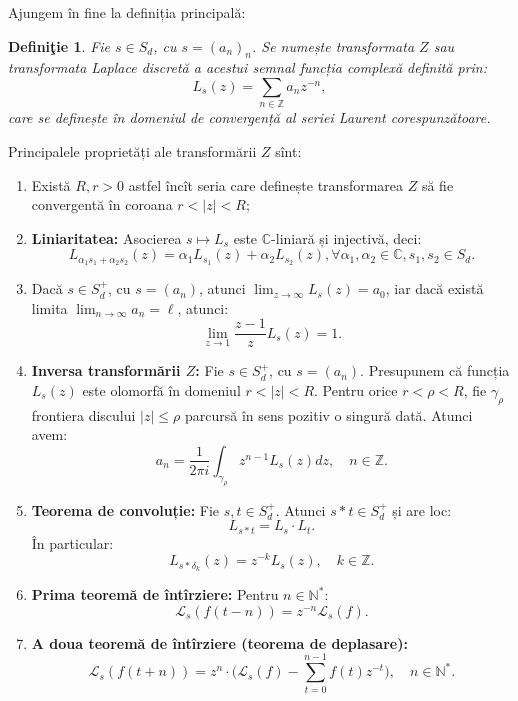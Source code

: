 \documentclass[12pt,a4paper]{article}
\newcommand\ds{\displaystyle}
\newcommand\NN{\mathbb{N}}
\newcommand\ZZ{\mathbb{Z}}
\newcommand\CC{\mathbb{C}}
\newcommand\Lap{\mathcal{L}}
\theoremstyle{dotless}
\theoremstyle{dotlessdr}
\newtheorem{definition}{Defini\c{t}ie}
\begin{document}
Ajungem în fine la definiția principală:
\begin{definition}\label{def:transf-z}
  Fie $ s \in S_d $, cu $ s = (a_n)_n $. Se numește \emph{transformata $ Z $} sau
  \emph{transformata Laplace discretă} a acestui semnal funcția complexă definită
  prin:
  \[
    L_s(z) = \sum_{n \in \ZZ} a_n z^{-n},
  \]
  care se definește în domeniul de convergență al seriei Laurent corespunzătoare.
\end{definition}

Principalele proprietăți ale transformării $ Z $ sînt:

\begin{enumerate}[(1)]
\item Există $ R, r > 0 $ astfel încît seria care definește transformarea $ Z $ să fie
  convergentă în coroana $ r < |z| < R $;
\item \textbf{Liniaritatea:} Asocierea $ s \mapsto L_s $ este $ \CC $-liniară și injectivă,
  deci:
  \[
    L_{\alpha_1 s_1 + \alpha_2 s_2}(z) = \alpha_1 L_{s_1}(z) + \alpha_2 L_{s_2}(z), %
    \forall \alpha_1, \alpha_2 \in \CC, s_1, s_2 \in S_d.
  \]
\item Dacă $ s \in S_d^+ $, cu $ s = (a_n) $, atunci $ \ds\lim_{z \to \infty} L_s(z) = a_0 $,
  iar dacă există limita $ \ds\lim_{n \to \infty} a_n = \ell $, atunci:
  \[
    \lim_{z \to 1} \frac{z - 1}{z} L_s(z) = 1.
  \]
\item \textbf{Inversa transformării $ Z $:} Fie $ s \in S_d^+ $, cu $ s = (a_n) $. Presupunem
  că funcția $ L_s(z) $ este olomorfă în domeniul $ r < |z| < R $. Pentru orice $ r < \rho < R $,
  fie $ \gamma_\rho $ frontiera discului $ |z| \leq \rho $ parcursă în sens pozitiv o singură
  dată. Atunci avem:
  \[
    a_n = \frac{1}{2 \pi i} \int_{\gamma_\rho} z^{n-1} L_s(z) dz, \quad n \in \ZZ.
  \]
\item \textbf{Teorema de convoluție:} Fie $ s, t \in S_d^+ $. Atunci $ s \ast t \in S_d^+ $ și
  are loc:
  \[
    L_{s \ast t} = L_s \cdot L_t.
  \]
  În particular:
  \[
    L_{s \ast \delta_k}(z) = z^{-k} L_s(z), \quad k \in \ZZ.
  \]
\item \textbf{Prima teoremă de întîrziere:} Pentru $ n \in \NN^\ast $:
  \[
    \Lap_s (f(t - n)) = z^{-n} \Lap_s(f).
  \]
\item \textbf{A doua teoremă de întîrziere (teorema de deplasare):}
  \[
    \Lap_s (f (t + n)) = z^n \cdot \Big( \Lap_s(f) - \sum_{t = 0}^{n-1} f(t) z^{-t} \Big), \quad %
    n \in \NN^\ast.
  \]
\end{enumerate}
\end{document}
